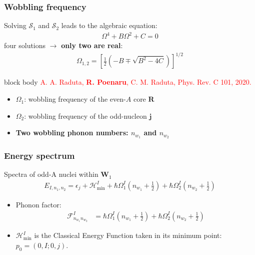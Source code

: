 \documentclass{beamer}
\begin{document}
\begin{frame}
	\frametitle{Wobbling frequency}
	Solving {\color{red}$\mathcal{S}_1$} and {\color{blue}$\mathcal{S}_2$} leads to the algebraic equation:
	\begin{align}
		\Omega^4+B\Omega^2+C=0\nonumber
	\end{align}
	four solutions $\longrightarrow$ \textbf{only two are real}:
	\begin{align}
		\Omega_{1,2}=\left[\frac{1}{2}\left(-B\mp\sqrt{B^2-4C}\right)\right]^{1/2}\nonumber
	\end{align}
	\vspace{-0.3cm}
	\begin{beamercolorbox}[rounded=true,shadow=false, wd=\linewidth,]{block body}
		\centering
		\textcolor{red}{\footnotesize{A. A. Raduta, \textbf{R. Poenaru}, C. M. Raduta, Phys. Rev. C 101, 2020.}}
	\end{beamercolorbox}
	\vspace{-0.3cm}
	\begin{itemize}
		\item {\color{red}$\Omega_1$}: wobbling frequency of the {\color{red}even-$A$ core $\mathbf{R}$}
		\item {\color{blue}$\Omega_2$}: wobbling frequency of the {\color{blue}odd-nucleon $\mathbf{j}$}
		\item \textbf{Two wobbling phonon numbers: {\color{red}$n_{w_1}$} and {\color{blue}$n_{w_2}$}}
	\end{itemize}
\end{frame}

\begin{frame}
	\frametitle{Energy spectrum}
	\begin{exampleblock}{Spectra of odd-A nuclei within $\mathbf{W}_1$}
		\begin{align}
			E_{I,n_1,n_2}=\epsilon_j+\mathcal{H}_\text{min}^I+\hbar\Omega_1^I\left(n_{w_1}+\frac{1}{2}\right)+\hbar\Omega_2^I\left(n_{w_2}+\frac{1}{2}\right)\nonumber
			\label{tsd-bands-general-spectrum}
		\end{align}
	\end{exampleblock}
	\begin{itemize}
		\item Phonon factor:
		\begin{align}
			\mathcal{F}_{n_{w_1}n_{w_2}}^I&=\hbar\Omega_1^I\left(n_{w_1}+\frac{1}{2}\right)+\hbar\Omega_2^I\left(n_{w_2}+\frac{1}{2}\right)\nonumber
		\end{align}
		\item $\mathcal{H}_\text{min}^I$ is the Classical Energy Function taken in its minimum point: $p_0=(0,I;0,j)$.
	\end{itemize}
\end{frame}
\end{document}

